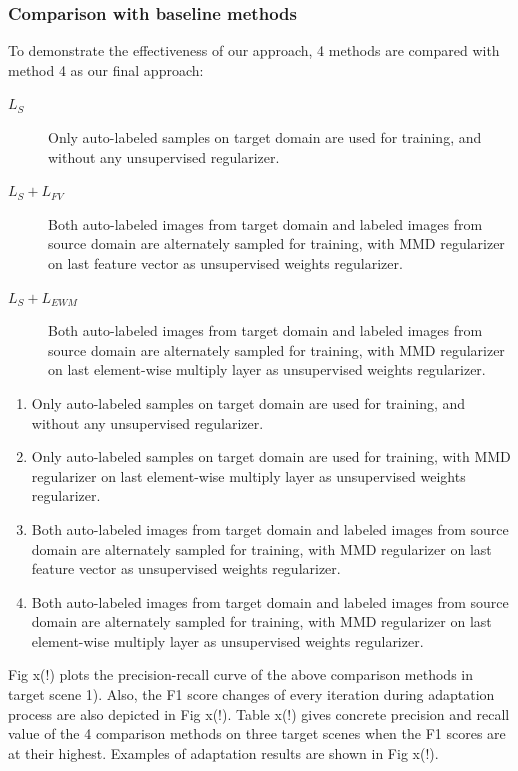 \documentclass[runningheads]{llncs}
\begin{document}
\subsubsection{Comparison with baseline methods}
To demonstrate the effectiveness of our approach, 4 methods are compared with method 4 as our final approach:
\begin{description}
  \item[$L_{S}$] Only auto-labeled samples on target domain are used for training, and without any unsupervised regularizer.
  \item[$L_{S}+L_{FV}$] Both auto-labeled images from target domain and labeled images from source domain are alternately sampled for training, with MMD regularizer on last feature vector as unsupervised weights regularizer.
  \item[$L_{S}+L_{EWM}$] Both auto-labeled images from target domain and labeled images from source domain are alternately sampled for training, with MMD regularizer on last element-wise multiply layer as unsupervised weights regularizer.
\end{description}
\begin{enumerate}
\item Only auto-labeled samples on target domain are used for training, and without any unsupervised regularizer.
\item Only auto-labeled samples on target domain are used for training, with MMD regularizer on last element-wise multiply layer as unsupervised weights regularizer.
\item Both auto-labeled images from target domain and labeled images from source domain are alternately sampled for training, with MMD regularizer on last feature vector as unsupervised weights regularizer.
\item Both auto-labeled images from target domain and labeled images from source domain are alternately sampled for training, with MMD regularizer on last element-wise multiply layer as unsupervised weights regularizer.
\end{enumerate}
Fig x(!) plots the precision-recall curve of the above comparison methods in target scene 1). Also, the F1 score changes of every iteration during adaptation process are also depicted in Fig x(!). Table x(!) gives concrete precision and recall value of the 4 comparison methods on three target scenes when the F1 scores are at their highest. Examples of adaptation results are shown in Fig x(!).
\end{document}
